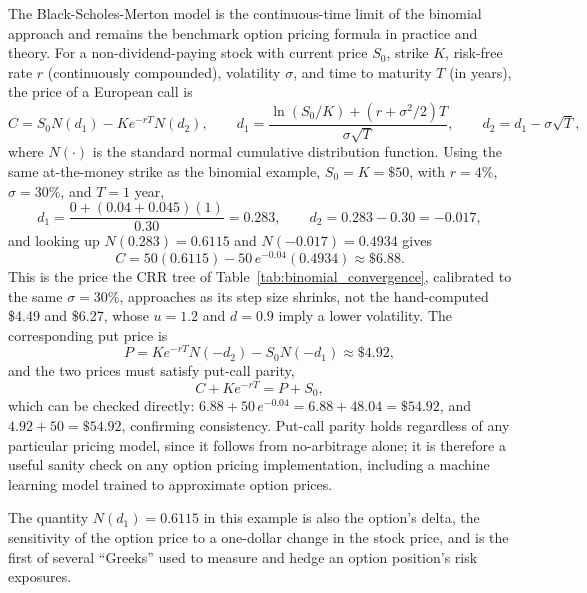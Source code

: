 \documentclass[../ai_in_finance]{subfiles}
\begin{document}
The Black-Scholes-Merton model is the continuous-time limit of the binomial approach and remains the benchmark option pricing formula in practice and theory. For a non-dividend-paying stock with current
price $S_0$, strike $K$, risk-free rate $r$ (continuously compounded), volatility $\sigma$, and time to maturity $T$ (in years), the price of a European call is
\begin{equation}
C = S_0 N(d_1) - K e^{-rT} N(d_2), \qquad
d_1 = \frac{\ln(S_0/K) + (r+\sigma^2/2)T}{\sigma\sqrt{T}}, \qquad
d_2 = d_1 - \sigma\sqrt{T},\label{eq:valuation-bsm}
\end{equation}
where $N(\cdot)$ is the standard normal cumulative distribution function. Using the same at-the-money strike as the binomial example, $S_0 = K = \$50$, with $r = 4\%$, $\sigma = 30\%$, and $T = 1$ year,
\begin{equation*}
d_1 = \frac{0 + (0.04+0.045)(1)}{0.30} = 0.283, \qquad d_2 = 0.283 - 0.30 = -0.017,
\end{equation*}
and looking up $N(0.283) = 0.6115$ and $N(-0.017) = 0.4934$ gives
\begin{equation*}
C = 50(0.6115) - 50\,e^{-0.04}(0.4934) \approx \$6.88.
\end{equation*}
This is the price the CRR tree of Table~\ref{tab:binomial_convergence}, calibrated to the same $\sigma=30\%$, approaches as its step size shrinks, not the hand-computed \$4.49 and \$6.27, whose $u=1.2$ and $d=0.9$ imply a lower volatility.
The corresponding put price is
\begin{equation*}
P = K e^{-rT} N(-d_2) - S_0 N(-d_1) \approx \$4.92,
\end{equation*}
and the two prices must satisfy put-call parity,
\begin{equation}
C + K e^{-rT} = P + S_0,\label{eq:valuation-put-call-parity}
\end{equation}
which can be checked directly: $6.88 + 50\,e^{-0.04} = 6.88 + 48.04 = \$54.92$, and $4.92 + 50 = \$54.92$, confirming consistency. Put-call parity holds regardless of any particular pricing model, since it follows from no-arbitrage alone;
it is therefore a useful sanity check on any option pricing implementation, including a machine learning model trained to approximate option prices.

The quantity $N(d_1) = 0.6115$ in this example is also the option's delta, the sensitivity of the option price to a one-dollar change in the stock price, and is the first of several ``Greeks'' used to
measure and hedge an option position's risk exposures.
\end{document}
